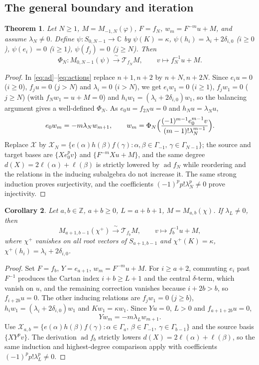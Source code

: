 \documentclass[11pt,a4paper]{article}
\newcommand{\C}{\mathbb C}
\newcommand{\Z}{\mathbb Z}
\newcommand{\ad}{\operatorname{ad}}
\newcommand{\T}{\mathcal T}
\newcommand{\X}{\mathcal X}
\newtheorem{theorem}{Theorem}[section]
\newtheorem{corollary}[theorem]{Corollary}
\begin{document}
\subsection{The general boundary and iteration}
\begin{theorem}\label{thm:N}
Let $N\ge1$, $M=M_{-1,N}(\varphi)$, $F=f_N$, $w_m=F^{-m}u+M$, and assume
$\lambda_N\ne0$. Define $\psi:S_{0,N-1}\to\C$ by $\psi(K)=\kappa$,
$\psi(h_i)=\lambda_i+2\delta_{i,0}$ ($i\ge0$), $\psi(e_i)=0$ ($i\ge1$),
$\psi(f_j)=0$ ($j\ge N$). Then
\[
 \Phi_N:M_{0,N-1}(\psi)\xrightarrow{\ \sim\ }\T_{f_N}M,
 \qquad v\longmapsto f_N^{-1}u+M.
\]
\end{theorem}
\begin{proof}
In \eqref{eq:ad}--\eqref{eq:actions} replace $n+1,n+2$ by $n+N,n+2N$.
Since $e_iu=0$ ($i\ge0$), $f_ju=0$ ($j>N$) and $\lambda_i=0$ ($i>N$), we get
$e_iw_1=0$ ($i\ge1$), $f_jw_1=0$ ($j\ge N$) (with $f_Nw_1=u+M=0$) and
$h_iw_1=(\lambda_i+2\delta_{i,0})w_1$, so the balancing argument gives a
well-defined $\Phi_N$. As $e_0u=f_{2N}u=0$ and $h_Nu=\lambda_Nu$,
\[
 e_0w_m=-m\lambda_Nw_{m+1},\qquad
 w_m=\Phi_N\Bigl(\frac{(-1)^{m-1}e_0^{m-1}v}{(m-1)!\lambda_N^{m-1}}\Bigr).
\]
Replace $\X$ by
$\X_N=\{e(\alpha)h(\beta)f(\gamma):\alpha,\beta\in\Gamma_{-1},\,
\gamma\in\Gamma_{N-1}\}$; the source and target bases are
$\{Xe_0^pv\}$ and $\{F^{-m}Xu+M\}$, and the same degree
$d(X)=2\ell(\alpha)+\ell(\beta)$ is strictly lowered by $\ad f_N$ while
reordering and the relations in the inducing subalgebra do not increase it.
The same strong induction proves surjectivity, and the coefficients
$(-1)^pp!\lambda_N^p\ne0$ prove injectivity.
\end{proof}

\begin{corollary}\label{cor:general}
Let $a,b\in\Z$, $a+b\ge0$, $L=a+b+1$, $M=M_{a,b}(\chi)$. If
$\lambda_L\ne0$, then
\[
 M_{a+1,b-1}(\chi^+)\xrightarrow{\ \sim\ }\T_{f_b}M,
 \qquad v\longmapsto f_b^{-1}u+M,
\]
where $\chi^+$ vanishes on all root vectors of $S_{a+1,b-1}$ and
$\chi^+(K)=\kappa$, $\chi^+(h_i)=\lambda_i+2\delta_{i,0}$.
\end{corollary}
\begin{proof}
Set $F=f_b$, $Y=e_{a+1}$, $w_m=F^{-m}u+M$. For $i\ge a+2$, commuting
$e_i$ past $F^{-1}$ produces the Cartan index $i+b\ge L+1$ and the central
$\delta$-term, which vanish on $u$, and the remaining correction vanishes
because $i+2b>b$, so $f_{i+2b}u=0$. The other inducing relations are
$f_jw_1=0$ ($j\ge b$), $h_iw_1=(\lambda_i+2\delta_{i,0})w_1$ and
$Kw_1=\kappa w_1$. Since $Yu=0$, $L>0$ and $f_{a+1+2b}u=0$,
\[
 Yw_m=-m\lambda_Lw_{m+1}.
\]
Use $\X_{a,b}=\{e(\alpha)h(\beta)f(\gamma):\alpha\in\Gamma_a,\,
\beta\in\Gamma_{-1},\ \gamma\in\Gamma_{b-1}\}$ and the source basis
$\{XY^pv\}$. The derivation $\ad f_b$ strictly lowers
$d(X)=2\ell(\alpha)+\ell(\beta)$, so the same induction and highest-degree
comparison apply with coefficients $(-1)^pp!\lambda_L^p\ne0$.
\end{proof}
\end{document}
